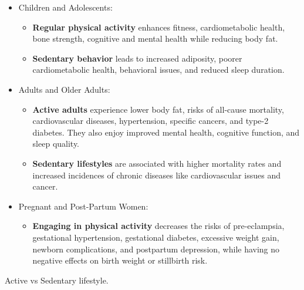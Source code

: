 \begin{table}
    \setstretch{\myspacing}
    \begin{itemize}[nosep] %
        \item Children and Adolescents:
              \begin{itemize}[nosep]
                  \item \textbf{Regular physical activity} enhances fitness, cardiometabolic health, bone strength, cognitive and mental health while reducing body fat.
                  \item \textbf{Sedentary behavior} leads to increased adiposity, poorer cardiometabolic health, behavioral issues, and reduced sleep duration.
              \end{itemize}
              
        \item Adults and Older Adults:
              \begin{itemize}[nosep]
                  \item \textbf{Active adults} experience lower body fat, risks of all-cause mortality, cardiovascular diseases, hypertension, specific cancers, and type-2 diabetes. They also enjoy improved mental health, cognitive function, and sleep quality.
                  \item \textbf{Sedentary lifestyles} are associated with higher mortality rates and increased incidences of chronic diseases like cardiovascular issues and cancer.
              \end{itemize}
              
        \item Pregnant and Post-Partum Women:
              \begin{itemize}[nosep]
                  \item \textbf{Engaging in physical activity} decreases the risks of pre-eclampsia, gestational hypertension, gestational diabetes, excessive weight gain, newborn complications, and postpartum depression, while having no negative effects on birth weight or stillbirth risk.
              \end{itemize}
    \end{itemize}
    \caption*{Active vs Sedentary lifestyle\cite{WhoPhysicalActivityBenefits}.}
\end{table}
